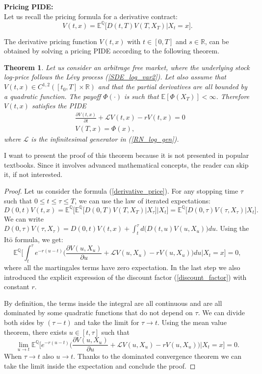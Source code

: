 \documentclass[a4paper,10pt]{article}
\newcommand{\numberset}{\mathbb}
\newcommand{\R}{\numberset{R}}
\newcommand{\E}{\numberset{E}}
\newcommand{\Q}{\numberset{Q}}
\newcommand{\LL}{\mathcal{L}}
\newtheorem{Theorem}{Theorem}[section]
\begin{document}
\noindent
\textbf{Pricing PIDE:}\\
Let us recall the pricing formula for a derivative contract:
 \begin{equation}\label{derivative_price}
  V(t,x) = \E^{\Q}  \biggl[ D(t,T) V(T,X_T) \bigg| X_t = x \biggr] . 
 \end{equation}

The derivative pricing function $V(t,x)$ with $t \in [0,T]$ and $s \in \R$, can be obtained by solving a pricing PIDE according to the following theorem.
\begin{Theorem}
 Let us consider an arbitrage free market, where the underlying stock log-price follows the Lévy process (\ref{SDE_log_var2}). 
 Let also assume that $V(t,x) \in C^{1,2}([t_0,T] \times \R)$ and that the partial derivatives are all bounded by a quadratic function.
 The payoff $\Phi(\cdot)$ is such that $\E[\Phi(X_T)]< \infty$. 
 Therefore $V(t,x)$ satisfies the PIDE
\begin{align}\label{derivative_PIDE}
 & \frac{\partial V(t,x)}{\partial t} + \LL V(t,x) -r V(t,x) = 0 \\
 & V(T,x) = \Phi(x),
\end{align}
where $\LL$ is the infinitesimal generator in (\ref{RN_log_gen}). 
\end{Theorem}
I want to present the proof of this theorem because it is not presented in popular textbooks. 
Since it involves advanced mathematical concepts, the reader can skip it, if not interested.
\begin{proof}
 Let us consider the formula (\ref{derivative_price}). 
 For any stopping time $\tau$ such that $0 \leq t \leq \tau \leq T$, we can use the law of iterated expectations:
 \begin{equation*}
   D(0,t) V(t,x) = \E^{\Q}  \biggl[ \E^{\Q} \bigl[ D(0,T) V(T,X_T) \big| X_{\tau} \bigr] \bigg| X_t \biggr] = \E^{\Q} \bigl[ D(0,\tau) V(\tau,X_{\tau}) \big| X_t \bigr]. 
 \end{equation*}
 We can write $D(0,\tau) V(\tau,X_{\tau}) = D(0,t) V(t,x) + \int_t^{\tau} d\bigl(D(t,u) V(u,X_u)\bigr) du$. 
 Using the It\=o formula, we get:
 $$ \E^{\Q} \biggl[ \int_t^{\tau} e^{-r(u-t)} \biggl( \frac{\partial V(u,X_u)}{\partial u} + \LL V(u,X_u) -r V(u,X_u) \biggr) du \bigg| X_t=x \biggr] = 0, $$
 where all the martingales terms have zero expectation. 
 In the last step we also introduced the explicit expression of the discount factor (\ref{discount_factor}) with constant $r$.
 
 By definition, the terms inside the integral are all continuous and are all dominated by some quadratic functions that do not depend on $\tau$.
 We can divide both sides by $(\tau-t)$ and take the limit for $\tau \to t$. Using the mean value theorem, there exists $u \in [t,\tau]$ such that 
 $$ \lim_{u \to t} \E^{\Q} \biggl[ e^{-r(u-t)} \biggl( \frac{\partial V(u,X_u)}{\partial u} + \LL V(u,X_u) -r V(u,X_u) \biggr) \bigg| X_t=x \biggr] = 0. $$
 When $\tau\to t$ also $u\to t$. Thanks to the dominated convergence theorem we can take the limit inside the expectation and conclude the proof.
\end{proof}
\end{document}
